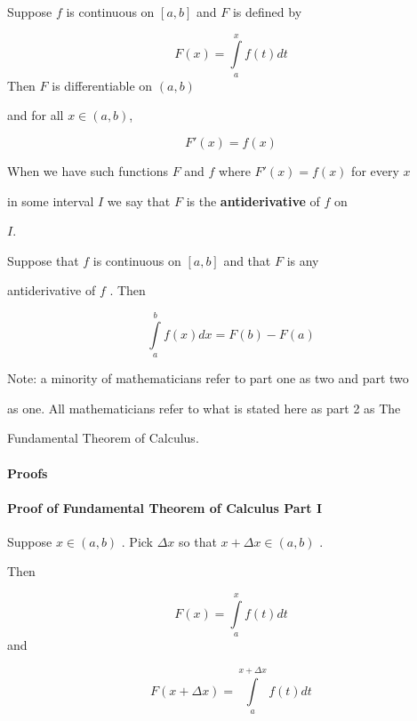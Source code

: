 Suppose $f$ is continuous on $[a,b]$ and $F$ is defined by



$$F(x)=\int\limits_a^x f(t)dt$$ Then $F$ is differentiable on $(a,b)$

and for all $x\in(a,b)$,



$$F'(x)=f(x)$$



When we have such functions $F$ and $f$ where $F'(x)=f(x)$ for every $x$

in some interval $I$ we say that $F$ is the \textbf{antiderivative} of $f$ on

$I$.



Suppose that $f$ is continuous on $[a,b]$ and that $F$ is any

antiderivative of $f$ . Then



$$\int\limits_a^b f(x)dx=F(b)-F(a)$$








Note: a minority of mathematicians refer to part one as two and part two

as one. All mathematicians refer to what is stated here as part 2 as The

Fundamental Theorem of Calculus.



\paragraph{Proofs}



\paragraph{Proof of Fundamental Theorem of Calculus Part I}



Suppose $x\in(a,b)$ . Pick $\Delta x$ so that $x+\Delta x\in(a,b)$ .

Then



$$F(x)=\int\limits_a^x f(t)dt$$ and



$$F(x+\Delta x)=\int\limits_a^{x+\Delta x}f(t)dt$$



